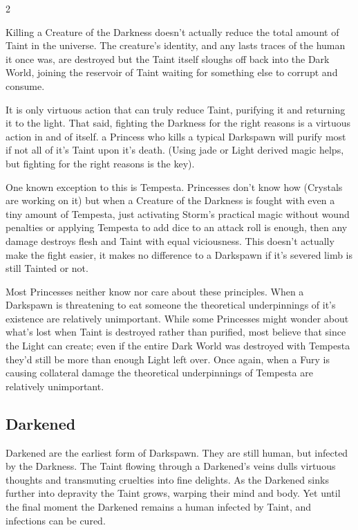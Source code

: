 \begin{multicols}{2}
\begin{mybox}
Killing a Creature of the Darkness doesn’t actually reduce the total amount of Taint in the universe. The creature's identity, and any lasts traces of the human it once was, are destroyed but the Taint itself sloughs off back into the Dark World, joining the reservoir of Taint waiting for something else to corrupt and consume. 



It is only virtuous action that can truly reduce Taint, purifying it and returning it to the light. That said, fighting the Darkness for the right reasons is a virtuous action in and of itself. a Princess who kills a typical Darkspawn will purify most if not all of it's Taint upon it's death. (Using jade or Light derived magic helps, but fighting for the right reasons is the key). 



One known exception to this is Tempesta. Princesses don't know how (Crystals are working on it) but when a Creature of the Darkness is fought with even a tiny amount of Tempesta, just activating Storm's practical magic without wound penalties or applying Tempesta to add dice to an attack roll is enough, then any damage destroys flesh and Taint with equal viciousness. This doesn’t actually make the fight easier, it makes no difference to a Darkspawn if it's severed limb is still Tainted or not. 



Most Princesses neither know nor care about these principles. When a Darkspawn is threatening to eat someone the theoretical underpinnings of it's existence are relatively unimportant. While some Princesses might wonder about what's lost when Taint is destroyed rather than purified, most believe that since the Light can create; even if the entire Dark World was destroyed with Tempesta they'd still be more than enough Light left over. Once again, when a Fury is causing collateral damage the theoretical underpinnings of Tempesta are relatively unimportant. 

\end{mybox}

\subsection*{Darkened}

Darkened are the earliest form of Darkspawn. They are still human, but infected by the Darkness. The Taint flowing through a Darkened's veins dulls virtuous thoughts and transmuting cruelties into fine delights. As the Darkened sinks further into depravity the Taint grows, warping their mind and body. Yet until the final moment the Darkened remains a human infected by Taint, and infections can be cured. 


\end{multicols}
